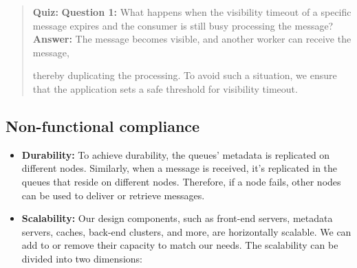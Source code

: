 \begin{quote}
\textbf{Quiz:}
\textbf{Question 1:} What happens when the visibility timeout of a specific message expires and the consumer is still busy processing the message?
\textbf{Answer:} The message becomes visible, and another worker can receive the message,

thereby duplicating the processing. To avoid such a situation, we ensure that the application sets a safe threshold for visibility timeout.
\end{quote}

\subsection{Non-functional compliance}\label{6Tg8z5DaNFU_ONJxznspU}

\begin{itemize}
\item
\protect{}\label{yDaUW1lj-80qj3-J977p3}
\textbf{Durability:} To achieve durability, the queues' metadata is replicated on different nodes. Similarly, when a message is received, it's replicated in the queues that reside on different nodes. Therefore, if a node fails, other nodes can be used to deliver or retrieve messages.
\item
\protect{}\label{WuhB9Np9YSG9VkC_o_BKq}
\textbf{Scalability:} Our design components, such as front-end servers, metadata servers, caches, back-end clusters, and more, are horizontally scalable. We can add to or remove their capacity to match our needs. The scalability can be divided into two dimensions:


\end{itemize}

